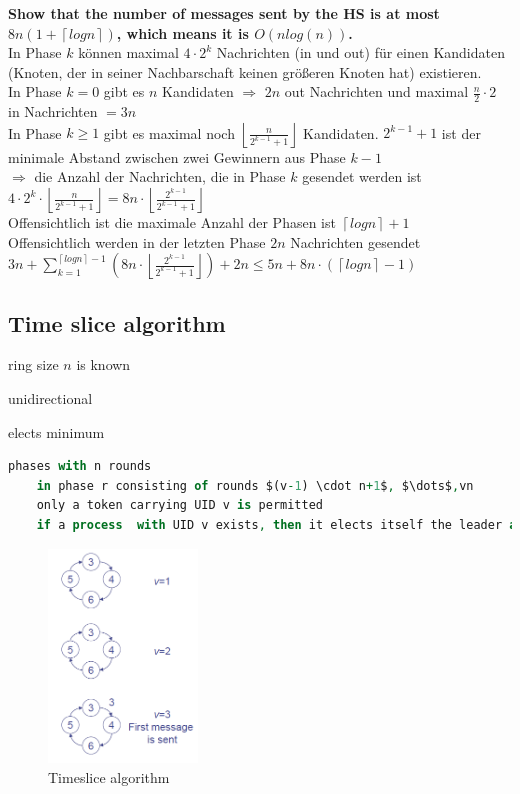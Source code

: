 \textbf{Show that the number of messages sent by the HS is at most $8n(1+\left\lceil logn\right\rceil )$, which means it is $O(nlog(n))$.}\\ 
In Phase $k$ können maximal $4\cdot2^{k}$ Nachrichten (in und out) für einen Kandidaten (Knoten, der in seiner Nachbarschaft keinen größeren Knoten hat) existieren.\\
In Phase $k=0$ gibt es $n$ Kandidaten $\Rightarrow$ $2n$ out Nachrichten und maximal $\frac{n}{2}\cdot2$ in Nachrichten $=3n$\\
In Phase $k\geq1$ gibt es maximal noch $\left\lfloor \frac{n}{2^{k-1}+1}\right\rfloor $ Kandidaten. $2^{k-1}+1$ ist der minimale Abstand zwischen zwei Gewinnern aus Phase $k-1$\\ $\Rightarrow$ die Anzahl der Nachrichten, die in Phase $k$ gesendet werden ist $4\cdot2^{k}\cdot\left\lfloor \frac{n}{2^{k-1}+1}\right\rfloor =8n\cdot\left\lfloor \frac{2^{k-1}}{2^{k-1}+1}\right\rfloor $\\ 
Offensichtlich ist die maximale Anzahl der Phasen ist $\left\lceil logn\right\rceil +1$\\
Offensichtlich werden in der letzten Phase $2n$ Nachrichten gesendet\\
$3n+\sum\limits _{k=1}^{\left\lceil logn\right\rceil -1}\left(8n\cdot\left\lfloor \frac{2^{k-1}}{2^{k-1}+1}\right\rfloor \right)+2n\leq5n+8n\cdot\left(\left\lceil logn\right\rceil -1\right)$ 


\subsection{Time slice algorithm}
\begin{compactitem}
\item ring size $n$ is known
\item unidirectional
\item elects minimum
\end{compactitem}


\begin{lstlisting}[mathescape, language=VHDL]
	phases with n rounds
	in phase r consisting of rounds $(v-1) \cdot n+1$, $\dots$,vn
	only a token carrying UID v is permitted
	if a process  with UID v exists, then it elects itself the leader and sends a token with it's UID
\end{lstlisting}

\begin{figure}[h]
	\centering
	\includegraphics[width=150px]{gfx/timeslice.png}
	\caption{Timeslice algorithm}
	\label{img:timeslice}
\end{figure}

